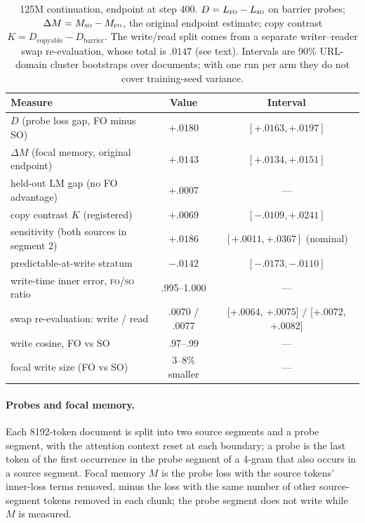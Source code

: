 \documentclass[11pt]{article}
\newcommand{\FO}{\textsc{fo}}
\newcommand{\SO}{\textsc{so}}
\begin{document}
\begin{table}[!htbp]
\centering
\caption{125M continuation, endpoint at step 400. $D=L_{\FO}-L_{\SO}$ on barrier probes;
$\Delta M=M_{\SO}-M_{\FO}$, the original endpoint estimate; copy contrast
$K=D_{\text{copyable}}-D_{\text{barrier}}$. The write/read split comes from a separate writer--reader
swap re-evaluation, whose total is $.0147$ (see text). Intervals are 90\% URL-domain cluster
bootstraps over documents; with one run per arm they do not cover training-seed variance.}
\label{tab:125m}
\small
\begin{tabular}{@{}lcc@{}}
\toprule
Measure & Value & Interval \\
\midrule
$D$ (probe loss gap, FO minus SO) & $+.0180$ & $[+.0163,+.0197]$ \\
$\Delta M$ (focal memory, original endpoint) & $+.0143$ & $[+.0134,+.0151]$ \\
held-out LM gap (no FO advantage) & $+.0007$ & --- \\
copy contrast $K$ (registered) & $+.0069$ & $[-.0109,+.0241]$ \\
\quad sensitivity (both sources in segment 2) & $+.0186$ & $[+.0011,+.0367]$ (nominal) \\
\quad predictable-at-write stratum & $-.0142$ & $[-.0173,-.0110]$ \\
write-time inner error, \FO/\SO{} ratio & .995--1.000 & --- \\
swap re-evaluation: write / read & .0070 / .0077 & [+.0064, +.0075] / [+.0072, +.0082] \\
write cosine, FO vs SO & .97--.99 & --- \\
focal write size (FO vs SO) & 3--8\% smaller & --- \\
\bottomrule
\end{tabular}
\end{table}

\paragraph{Probes and focal memory.} Each 8192-token document is split into two source segments and
a probe segment, with the attention context reset at each boundary; a probe is the last token of the
first occurrence in the probe segment of a 4-gram that also occurs in a source segment. Focal memory
$M$ is the probe loss with the source tokens' inner-loss terms removed, minus the loss with the same
number of other source-segment tokens removed in each chunk; the probe segment does not write while
$M$ is measured.
\end{document}
